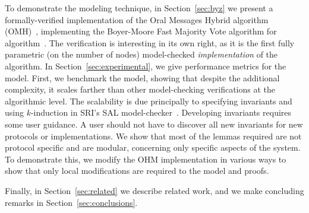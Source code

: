 \documentclass{llncs/llncs}
\begin{document}
To demonstrate the modeling technique, in Section~\ref{sec:byz} we present a formally-verified implementation of the Oral Messages Hybrid algorithm (OMH)~\cite{Lincoln-Rushby}, implementing the Boyer-Moore Fast Majority Vote algorithm for algorithm~\cite{Boyer-Moore:91}. The verification is interesting in its own right, as it is the first fully parametric (on the number of nodes) model-checked \emph{implementation} of the algorithm. In Section~\ref{sec:experimental}, we give performance metrics for the model. First, we benchmark the model, showing that despite the additional complexity, it scales farther than other model-checking verifications at the algorithmic level. The scalability is due principally to specifying invariants and using $k$-induction in SRI's SAL model-checker~\cite{sal}. Developing invariants requires some user guidance. A user should not have to discover all new invariants for new protocols or implementations. We show that most of the lemmas required are not protocol specific and are modular, concerning only specific aspects of the system. To demonstrate this, we modify the OHM implementation in various ways to show that only local modifications are required to the model and proofs.

Finally, in Section~\ref{sec:related} we describe related work, and we make concluding remarks in Section~\ref{sec:conclusions}.




\end{document}
